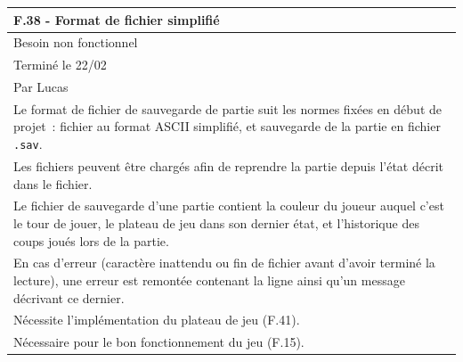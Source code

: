 \documentclass[a4paper,12pt]{article}
\begin{document}
\vspace{1cm}

\noindent
\setlength{\arrayrulewidth}{1.5pt}
\renewcommand{\arraystretch}{1.5}
\begin{tabularx}{\textwidth}{|X|}
    \hline
    \textbf{F.38 - Format de fichier simplifié}                                                                                                                                                    \\
    \hline
    Besoin non fonctionnel                                                                                                                                                                         \\
    \hline
    Terminé le 22/02                                                                                                                                                                               \\
    Par Lucas                                                                                                                                                                                      \\
    \hline
    Le format de fichier de sauvegarde de partie suit les normes fixées en début de projet~: fichier au format ASCII simplifié, et sauvegarde de la partie en fichier \texttt{.sav}.               \\
    Les fichiers peuvent être chargés afin de reprendre la partie depuis l’état décrit dans le fichier.                                                                                            \\
    Le fichier de sauvegarde d’une partie contient la couleur du joueur auquel c’est le tour de jouer, le plateau de jeu dans son dernier état, et l’historique des coups joués lors de la partie. \\
    En cas d’erreur (caractère inattendu ou fin de fichier avant d’avoir terminé la lecture), une erreur est remontée contenant la ligne ainsi qu’un message décrivant ce dernier.                 \\
    \hline
    Nécessite l’implémentation du plateau de jeu (F.41).                                                                                                                                           \\
    Nécessaire pour le bon fonctionnement du jeu (F.15).                                                                                                                                           \\
    \hline
\end{tabularx}
\end{document}
